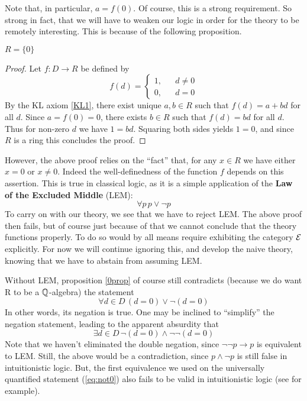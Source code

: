 Note that, in particular, \( a=f(0) \). Of course, this is a strong requirement. So strong in fact, that we will have to weaken our logic in order for the theory to be remotely interesting. This is because of the following proposition.

\begin{proposition}
  \label{0prop}
  \( R=\{0\} \)
\end{proposition}

\begin{proof}
  Let \( f:D\to R \) be defined by
  \begin{equation*}
    f(d) =
    \left\{ 
      \begin{aligned}
	1,& & d \neq 0 \\
	0,& & d = 0
      \end{aligned}
    \right.
  \end{equation*}
By the KL axiom \ref{KL1}, there exist unique \( a,b\in R \) such that \( f(d) = a + bd \) for all \( d \). Since \( a =  f(0) = 0 \), there exists \( b\in R \) such that \( f(d) = bd \) for all \( d \). Thus for non-zero \( d \) we have \( 1 = bd \). Squaring both sides yields \( 1 = 0 \), and since \( R \) is a ring this concludes the proof.
\end{proof}

However, the above proof relies on the ``fact'' that, for any \( x\in R \) we have either \( x = 0 \) or \( x\neq0 \). Indeed the well-definedness of the function \( f \) depends on this assertion. This is true in classical logic, as it is a simple application of the \textbf{Law of the Excluded Middle} (LEM):
\begin{equation*}
  \forall p\, p\vee \neg p
\end{equation*}
To carry on with our theory, we see that we have to reject LEM. The above proof then fails, but of course just because of that we cannot conclude that the theory functions properly. To do so would by all means require exhibiting the category \( \mathcal{E} \) explicitly. For now we will continue ignoring this, and develop the naive theory, knowing that we have to abstain from assuming LEM.

Without LEM, proposition \ref{0prop} of course still contradicts (because we do want R to be a \( \mathbb{Q} \)-algebra) the statement
\begin{equation}
  \forall d\in D\,(d=0) \vee \neg (d=0)
  \label{eq:not0}
\end{equation}
In other words, its negation is true. One may be inclined to ``simplify'' the negation statement, leading to the apparent absurdity that
\begin{equation*}
  \exists d\in D\, \neg(d=0) \wedge \neg\neg (d=0)
\end{equation*}
Note that we haven't eliminated the double negation, since \( \neg\neg p\rightarrow p \) is equivalent to LEM. Still, the above would be a contradiction, since \( p\wedge \neg p \) is still false in intuitionistic logic. But, the first equivalence we used on the universally quantified statement (\ref{eq:not0}) also fails to be valid in intuitionistic logic (see \cite[p. 248]{fra84} for example).

